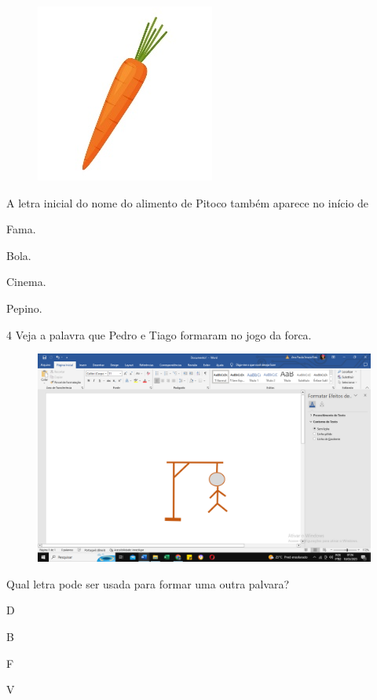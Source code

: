 \begin{figure}[htpb!]
\centering
\includegraphics[width=.4\textwidth]{media/image149.jpeg}
\end{figure}


A letra inicial do nome do alimento de Pitoco também aparece no início de


\begin{multicols}{2}
\begin{escolha}
\item Fama.

\item Bola.

\item Cinema.

\item Pepino.
\end{escolha}
\end{multicols}

\num{4} Veja a palavra que Pedro e Tiago formaram no jogo da forca.

\begin{figure}[htpb!]
\centering
\includegraphics[width=.5\textwidth]{media/image150.png}
\end{figure}

Qual letra pode ser usada para formar uma outra palvara?

\begin{multicols}{2}
\begin{escolha}
\item D

\item B

\item F

\item V
\end{escolha}
\end{multicols}

